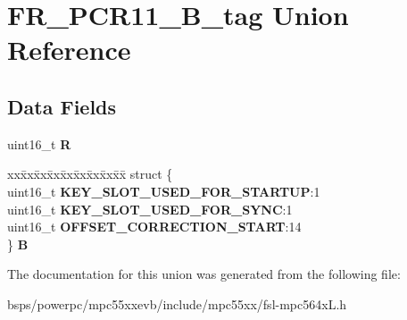 \hypertarget{unionFR__PCR11__16B__tag}{}\section{F\+R\+\_\+\+P\+C\+R11\+\_\+B\+\_\+tag Union Reference}
\label{unionFR__PCR11__16B__tag}
\subsection*{Data Fields}
\begin{DoxyCompactItemize}
\item 
\mbox{\label{unionFR__PCR11__16B__tag_a00e928113023f45474e2af1fae3c6e7c}} 
uint16\+\_\+t {\bfseries R}
\item 
\mbox{\label{unionFR__PCR11__16B__tag_a6dee175ad23786d005e7796b01a19ec0}} 
\begin{tabbing}
xx\=xx\=xx\=xx\=xx\=xx\=xx\=xx\=xx\=\kill
struct \{\\
\>uint16\_t {\bfseries KEY\_SLOT\_USED\_FOR\_STARTUP}:1\\
\>uint16\_t {\bfseries KEY\_SLOT\_USED\_FOR\_SYNC}:1\\
\>uint16\_t {\bfseries OFFSET\_CORRECTION\_START}:14\\
\} {\bfseries B}\\

\end{tabbing}\end{DoxyCompactItemize}


The documentation for this union was generated from the following file\+:\begin{DoxyCompactItemize}
\item 
bsps/powerpc/mpc55xxevb/include/mpc55xx/fsl-\/mpc564x\+L.\+h\end{DoxyCompactItemize}
